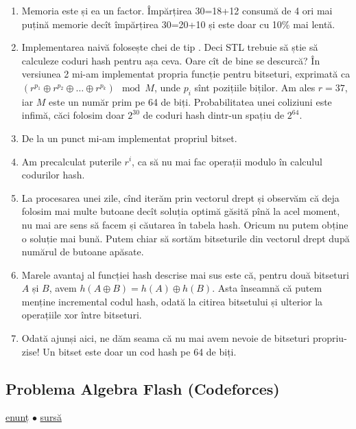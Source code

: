 \documentclass[../main.tex]{subfiles}
\begin{document}
\begin{enumerate}
  \item Memoria este și ea un factor. Împărțirea 30=18+12 consumă de 4 ori mai puțină memorie decît împărțirea 30=20+10 și este doar cu 10\% mai lentă.

  \item Implementarea naivă folosește chei de tip . Deci STL trebuie să știe să calculeze coduri hash pentru așa ceva. Oare cît de bine se descurcă? În versiunea 2 mi-am implementat propria funcție  pentru bitseturi, exprimată ca $(r^{p_1} \oplus r^{p_2} \oplus \dots \oplus r^{p_k}) \mod M$, unde $p_i$ sînt pozițiile biților. Am ales $r = 37$, iar $M$ este un număr prim pe 64 de biți. Probabilitatea unei coliziuni este infimă, căci folosim doar $2^{30}$ de coduri hash dintr-un spațiu de $2^{64}$.

  \item De la un punct mi-am implementat propriul bitset.

  \item Am precalculat puterile $r^i$, ca să nu mai fac operații modulo în calculul codurilor hash.

  \item La procesarea unei zile, cînd iterăm prin vectorul drept și observăm că deja folosim mai multe butoane decît soluția optimă găsită pînă la acel moment, nu mai are sens să facem și căutarea în tabela hash. Oricum nu putem obține o soluție mai bună. Putem chiar să sortăm bitseturile din vectorul drept după numărul de butoane apăsate.

  \item Marele avantaj al funcției hash descrise mai sus este că, pentru două bitseturi $A$ și $B$, avem $h(A \oplus B) = h(A) \oplus h(B)$. Asta înseamnă că putem menține incremental codul hash, odată la citirea bitsetului și ulterior la operațiile xor între bitseturi.

  \item Odată ajunși aici, ne dăm seama că nu mai avem nevoie de bitseturi propriu-zise! Un bitset este doar un cod hash pe 64 de biți.
\end{enumerate}


\subsection{Problema Algebra Flash (Codeforces)}
\label{problem:algebra-flash}

\href{https://codeforces.com/contest/1767/problem/E}{enunț}
$\bullet$
\hyperref[code:algebra-flash]{sursă}
\end{document}
